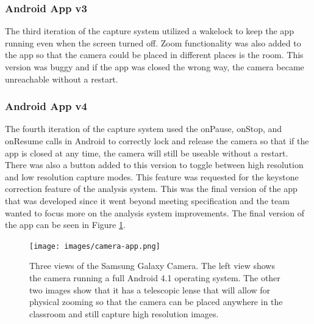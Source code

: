 \documentclass[]{article}
\begin{document}
			\subsubsection{Android App v3}
				The third iteration of the capture system utilized a wakelock to keep the app running even when the screen turned off. Zoom functionality was also added to the app so that the camera could be placed in different places is the room. This version was buggy and if the app was closed the wrong way, the camera became unreachable without a restart. 
				
			\subsubsection{Android App v4}
				The fourth iteration of the capture system used the onPause, onStop, and onResume calls in Android to correctly lock and release the camera so that if the app is closed at any time, the camera will still be useable without a restart. There was also a button added to this version to toggle between high resolution and low resolution capture modes. This feature was requested for the keystone correction feature of the analysis system. This was the final version of the app that was developed since it went beyond meeting specification and the team wanted to focus more on the analysis system improvements. The final version of the app can be seen in Figure \ref{img:camera-app}.
				
				\begin{figure}[h]
					\centering
					\texttt{[image: images/camera-app.png]}
					\caption{Three views of the Samsung Galaxy Camera. The left view shows the camera running a full Android 4.1 operating system. The other two images show that it has a telescopic lense that will allow for physical zooming so that the camera can be placed anywhere in the classroom and still capture high resolution images.}		
					\label{img:camera-app}
				\end{figure}
				
		
\end{document}
